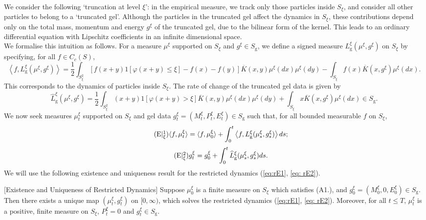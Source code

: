 We consider the following `truncation at level $\xi$': in the empirical measure, we track only those particles inside $S_\xi$, and consider all other particles to belong to a `truncated gel'. Although the particles in the truncated gel affect the dynamics in $S_\xi$, these contributions depend only on the total mass, momentum and energy $g^\xi$ of the truncated gel, due to the bilinear form of the kernel. This leads to an ordinary differential equation with Lipschitz coefficients in an infinite dimensional space. \medskip \\ We formalise this intuition as follows.  For a measure $\mu^\xi$ supported on $S_\xi$ and $g^\xi\in S_\mathrm{g}$, we define a signed measure $L^\xi_\mathrm{g}(\mu^\xi, g^\xi)$ on $S_\xi$ by specifying, for all $f\in C_c(S)$, \begin{equation}\label{eq: truncated drift 1} \left\langle f, L^\xi_\mathrm{g}(\mu^\xi, g^\xi)\right\rangle=\frac{1}{2}\int_{S_\xi^2}[f(x+y)1[\varphi(x+y)\le \xi]-f(x)-f(y)]\overline{K}(x,y)\mu^\xi(dx)\mu^\xi(dy)-\int_{S_\xi}f(x)\overline{K}(x,g^\xi)\mu^\xi(dx). \end{equation} This corresponds to the dynamics of particles inside $S_\xi$. The rate of change of the truncated gel data is given by \begin{equation} \label{eq: truncated drift 2} \widehat{L}^\xi_\mathrm{g}(\mu^\xi,g^\xi)=\frac{1}{2}\int_{S_\xi^2} (x+y)1[\varphi(x+y)> \xi]\overline{K}(x,y)\mu^\xi(dx)\mu^\xi(dy)+\int_{S_\xi}x\overline{K}(x,g^\xi)\mu^\xi(dx)\in S_\mathrm{g}.\end{equation}We now seek measures $\mu^\xi_t$ supported on $S_\xi$ and gel data $g^\xi_t=(M^\xi_t, P^\xi_t, E^\xi_t)\in S_\mathrm{g}$ such that, for all bounded measurable $f$ on $S_\xi$, \begin{equation} \tag{E$|^1_\mathrm{\xi}$} \label{eq:rE1}  \langle f, \mu^\xi_t\rangle = \langle f, \mu^\xi_0\rangle +\int_0^t\left\langle f, L^\xi_\mathrm{g}(\mu^\xi_s, g^\xi_s)\right\rangle ds;\end{equation}
\begin{equation} \label{eq: rE2} \tag{E$|^2_\mathrm{\xi}$}
g^\xi_t=g^\xi_0+\int_0^t\widehat{L}^\xi_\mathrm{g}(\mu^{\xi}_s,g^\xi_s)ds.
\end{equation} 
We will use the following existence and uniqueness result for the restricted dynamics (\ref{eq:rE1}, \ref{eq: rE2}).
\begin{lemma}\label{lemma: E and U of Restricted}[Existence and Uniqueness of Restricted Dynamics]\label{lemma: restricted dynamics} Suppose $\mu^\xi_0$ is a finite measure on $S_\xi$ which satisfies ({A1}.), and $g^\xi_0 = (M^\xi_0, 0, E^\xi_0)\in S_\mathrm{g}$. Then there exists a unique map $(\mu^\xi_t, g^\xi_t)$ on $[0, \infty)$, which solves the restricted dynamics (\ref{eq:rE1}, \ref{eq: rE2}). Moreover, for all $t\le T$, $\mu^\xi_t$ is a positive, finite measure on $S_\xi$, $P^\xi_t=0$ and $g^\xi_t \in S_\mathrm{g}$. 
\end{lemma}
